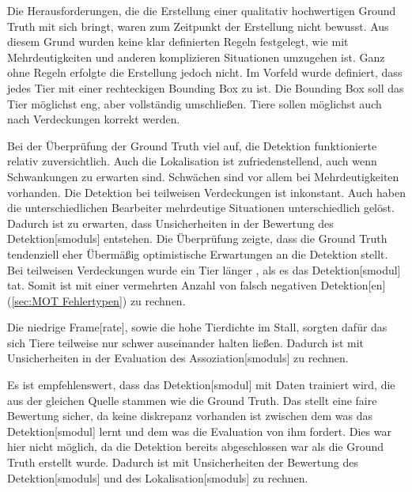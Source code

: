 Die Herausforderungen, die die Erstellung einer qualitativ hochwertigen \gls{Ground Truth} mit sich bringt, waren zum Zeitpunkt der Erstellung nicht bewusst. Aus diesem Grund wurden keine klar definierten Regeln festgelegt, wie mit Mehrdeutigkeiten und anderen komplizieren Situationen umzugehen ist. Ganz ohne Regeln erfolgte die Erstellung jedoch nicht. Im Vorfeld wurde definiert, dass jedes Tier mit einer rechteckigen \gls{Bounding Box} zu  ist. Die \gls{Bounding Box} soll das Tier möglichst eng, aber vollständig umschließen. Tiere sollen möglichst auch nach Verdeckungen korrekt  werden. \par 

Bei der Überprüfung der \gls{Ground Truth} viel auf, die \gls{Detektion} funktionierte relativ zuversichtlich. Auch die \gls{Lokalisation} ist zufriedenstellend, auch wenn Schwankungen zu erwarten sind. Schwächen sind vor allem bei Mehrdeutigkeiten vorhanden. Die \gls{Detektion} bei teilweisen Verdeckungen ist inkonstant. Auch haben die unterschiedlichen Bearbeiter mehrdeutige Situationen unterschiedlich gelöst. Dadurch ist zu erwarten, dass Unsicherheiten in der Bewertung des \gls{Detektion}[smoduls] entstehen. Die Überprüfung zeigte, dass die \gls{Ground Truth} tendenziell eher Übermäßig optimistische Erwartungen an die \gls{Detektion} stellt. Bei teilweisen Verdeckungen wurde ein Tier länger , als es das \gls{Detektion}[smodul] tat. Somit ist mit einer vermehrten Anzahl von falsch negativen \gls{Detektion}[en] (\ref{sec:MOT Fehlertypen}) zu rechnen. \par

Die niedrige \gls{Frame}[rate], sowie die hohe Tierdichte im Stall, sorgten dafür das sich Tiere teilweise nur schwer auseinander halten ließen. Dadurch ist mit Unsicherheiten in der Evaluation des \gls{Assoziation}[smoduls] zu rechnen. 

Es ist empfehlenswert, dass das \gls{Detektion}[smodul] mit Daten trainiert wird, die aus der gleichen Quelle stammen wie die \gls{Ground Truth}. Das stellt eine faire Bewertung sicher, da keine diskrepanz vorhanden ist zwischen dem was das \gls{Detektion}[smodul] lernt und dem was die Evaluation von ihm fordert. Dies war hier nicht möglich, da die \gls{Detektion} bereits abgeschlossen war als die \gls{Ground Truth} erstellt wurde. Dadurch ist mit Unsicherheiten der Bewertung des \gls{Detektion}[smoduls] und des \gls{Lokalisation}[smoduls] zu rechnen.\par

